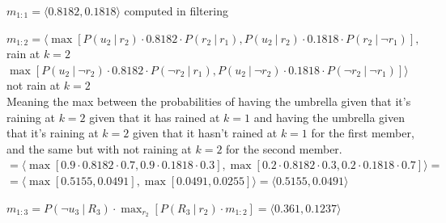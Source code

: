 \documentclass[10pt]{report}
\begin{document}
\begin{list}{}{Viterbi algorithm}
\item $m_{1:1} = \langle 0.8182, 0.1818\rangle$ computed in filtering
\item $m_{1:2} = \langle\max[P(u_2\:|\:r_2)\cdot 0.8182\cdot P(r_2\:|\:r_1), P(u_2\:|\:r_2)\cdot 0.1818 \cdot P(r_2\:|\:\neg r_1) ],$ rain at $k=2$\\$\max[ P(u_2\:|\:\neg r_2)\cdot 0.8182\cdot P(\neg r_2\:|\:r_1),P(u_2\:|\:\neg r_2)\cdot 0.1818 \cdot P(\neg r_2\:|\:\neg r_1) ]\rangle$ not rain at $k=2$\\
Meaning the max between the probabilities of having the umbrella given that it's raining at $k=2$ given that it has rained at $k=1$ and having the umbrella given that it's raining at $k=2$ given that it hasn't rained at $k=1$ for the first member, and the same but with not raining at $k=2$ for the second member.\\
$=\langle\max[0.9\cdot0.8182\cdot0.7, 0.9\cdot0.1818\cdot 0.3], \max[0.2\cdot0.8182\cdot0.3, 0.2\cdot0.1818\cdot0.7]\rangle =$\\
$=\langle\max[0.5155, 0.0491], \max[0.0491, 0.0255]\rangle = \langle 0.5155, 0.0491\rangle$
\item $m_{1:3} = P(\neg u_3\:|\:R_3) \cdot \max_{r_2}[P(R_3\:|\:r_2)\cdot m_{1:2}] = \langle 0.361, 0.1237\rangle$
\end{list}
\end{document}
